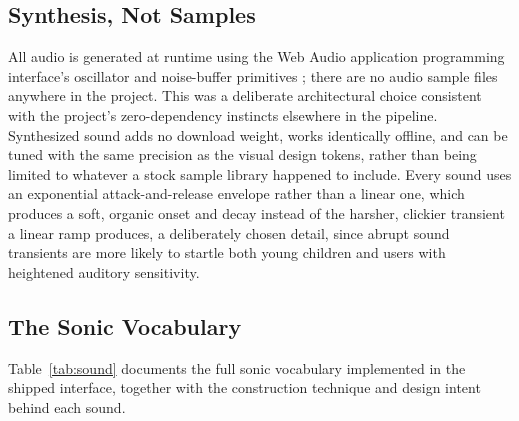 \documentclass[conference]{IEEEtran}
\begin{document}
\subsection{Synthesis, Not Samples}

All audio is generated at runtime using the Web Audio application programming interface's oscillator and noise-buffer primitives \cite{w3cwebaudio}; there are no audio sample files anywhere in the project. This was a deliberate architectural choice consistent with the project's zero-dependency instincts elsewhere in the pipeline. Synthesized sound adds no download weight, works identically offline, and can be tuned with the same precision as the visual design tokens, rather than being limited to whatever a stock sample library happened to include. Every sound uses an exponential attack-and-release envelope rather than a linear one, which produces a soft, organic onset and decay instead of the harsher, clickier transient a linear ramp produces, a deliberately chosen detail, since abrupt sound transients are more likely to startle both young children and users with heightened auditory sensitivity.

\subsection{The Sonic Vocabulary}

Table~\ref{tab:sound} documents the full sonic vocabulary implemented in the shipped interface, together with the construction technique and design intent behind each sound.
\end{document}
